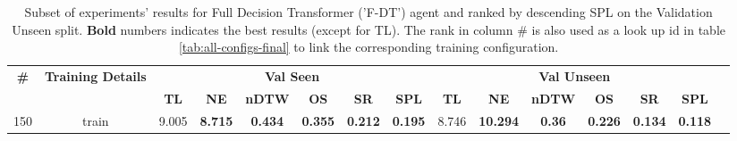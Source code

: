 \begin{table}
\centering
\caption{\label{tab:f_dt_action_for_final_pred}Subset of experiments' results for Full Decision Transformer ('F-DT') agent and ranked by descending SPL on the Validation Unseen split. \textbf{Bold} numbers indicates the best results (except for TL). The rank in column \# is also used as a look up id in table \ref{tab:all-configs-final} to link the corresponding training configuration.}
\begin{tabular}{@{\hskip3pt}c@{\hskip3pt}c@{\hskip3pt}c@{\hskip3pt}c@{\hskip3pt}c@{\hskip3pt}c@{\hskip3pt}c@{\hskip3pt}c@{\hskip3pt}c@{\hskip3pt}c@{\hskip3pt}c@{\hskip3pt}c@{\hskip3pt}c@{\hskip3pt}c@{\hskip3pt}c}
\toprule
                                  \textbf{\#} & \textbf{Training Details} & \multicolumn{6}{c}{\textbf{Val Seen}} & \multicolumn{6}{c}{\textbf{Val Unseen}} \\
\cmidrule(l){3-8}\cmidrule(l){9-14}\textbf{~} &                \textbf{~} &       \textbf{TL} &     \textbf{NE} &   \textbf{nDTW} &     \textbf{OS} &     \textbf{SR} &    \textbf{SPL} &         \textbf{TL} &      \textbf{NE} &  \textbf{nDTW} &     \textbf{OS} &     \textbf{SR} &    \textbf{SPL} \\
\midrule
                                          150 &                     train &             9.005 &  \textbf{8.715} &  \textbf{0.434} &  \textbf{0.355} &  \textbf{0.212} &  \textbf{0.195} &               8.746 &  \textbf{10.294} &  \textbf{0.36} &  \textbf{0.226} &  \textbf{0.134} &  \textbf{0.118} \\
\bottomrule
\end{tabular}
\end{table}
